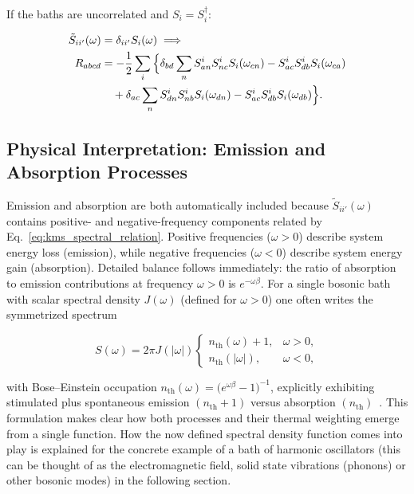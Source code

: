 \noindent
If the baths are uncorrelated and $S_i=S_i^\dagger$:

\begin{align}
\tilde{S}_{ii'}(\omega) &= \delta_{ii'} S_i(\omega) \implies \notag \\
R_{abcd} &= -\frac{1}{2} \sum_{i} \Big\{
\delta_{bd} \sum_n S^{i}_{an} S^{i}_{nc} S_{i}(\omega_{cn})
- S^{i}_{ac} S^{i}_{db} S_{i}(\omega_{ca}) \notag \\
&\quad + \delta_{ac} \sum_n S^{i}_{dn} S^{i}_{nb} S_{i}(\omega_{dn})
- S^{i}_{ac} S^{i}_{db} S_{i}(\omega_{db})
\Big\}.
\label{eq:Rabcd_uncor}
\end{align}


\subsection{Physical Interpretation: Emission and Absorption Processes}
\label{subsec:physical_emission_absorption}

\noindent
Emission and absorption are both automatically included because $\tilde{S}_{ii'}(\omega)$ contains positive- and negative-frequency components related by Eq.~\eqref{eq:kms_spectral_relation}. Positive frequencies ($\omega>0$) describe system energy loss (emission), while negative frequencies ($\omega<0$) describe system energy gain (absorption). Detailed balance follows immediately: the ratio of absorption to emission contributions at frequency $\omega>0$ is $e^{- \omega \beta}$. For a single bosonic bath with scalar spectral density $J(\omega)$ (defined for $\omega>0$) one often writes the symmetrized spectrum

\begin{equation}
	S(\omega) = 2\pi J(|\omega|) \begin{cases} n_{\text{th}}(\omega)+1, & \omega>0, \\ n_{\text{th}}(|\omega|), & \omega<0, \end{cases}
	\label{eq:bose_symmetric_spectrum}
\end{equation}

\noindent
with Bose--Einstein occupation $n_{\text{th}}(\omega) = \big(e^{\omega \beta}-1\big)^{-1}$, explicitly exhibiting stimulated plus spontaneous emission $(n_{\text{th}}+1)$ versus absorption $(n_{\text{th}})$~\cite{weiss2012quantumdissipativesystems}. This formulation makes clear how both processes and their thermal weighting emerge from a single function. How the now defined spectral density function comes into play is explained for the concrete example of a bath of harmonic oscillators (this can be thought of as the electromagnetic field, solid state vibrations (phonons) or other bosonic modes) in the following section. 



